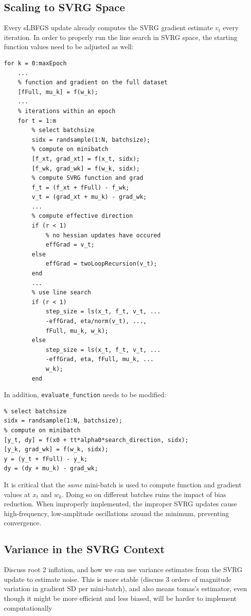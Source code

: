 \documentclass{article}
\begin{document}
\subsection{Scaling to SVRG Space}
Every sLBFGS update already computes the SVRG gradient estimate $v_t$ every iteration. In order to properly run the line search in SVRG space, the starting function values need to be adjusted as well:
\begin{lstlisting}
for k = 0:maxEpoch
	...
	% function and gradient on the full dataset
	[fFull, mu_k] = f(w_k);
	...
	% iterations within an epoch
	for t = 1:m
		% select batchsize 
		sidx = randsample(1:N, batchsize);
		% compute on minibatch
		[f_xt, grad_xt] = f(x_t, sidx);
		[f_wk, grad_wk] = f(w_k, sidx);
		% compute SVRG function and grad
		f_t = (f_xt + fFull) - f_wk;
		v_t = (grad_xt + mu_k) - grad_wk;
		...
		% compute effective direction
		if (r < 1)
			% no hessian updates have occured
			effGrad = v_t;
		else
			effGrad = twoLoopRecursion(v_t);
		end
		...
		% use line search
		if (r < 1)
			step_size = ls(x_t, f_t, v_t, ...
			-effGrad, eta/norm(v_t), ..., 
			fFull, mu_k, w_k);
		else
			step_size = ls(x_t, f_t, v_t, ...
			-effGrad, eta, fFull, mu_k, ...
			w_k);
		end
\end{lstlisting}
In addition, \texttt{evaluate_function} needs to be modified:
\begin{lstlisting}
% select batchsize
sidx = randsample(1:N, batchsize);
% compute on minibatch
[y_t, dy] = f(x0 + tt*alpha0*search_direction, sidx);
[y_k, grad_wk] = f(w_k, sidx);
y = (y_t + fFull) - y_k;
dy = (dy + mu_k) - grad_wk;
\end{lstlisting}
It is critical that the \emph{same} mini-batch is used to compute function and gradient values at $x_t$ and $w_k$. Doing so on different batches ruins the impact of bias reduction. When improperly implemented, the improper SVRG updates cause high-frequency, low-amplitude oscillations around the minimum, preventing convergence.
\subsection{Variance in the SVRG Context}
Discuss root 2 inflation, and how we can use variance estimates from the SVRG update to estimate noise. This is more stable (discuss 3 orders of magnitude variation in gradient SD per mini-batch), and also means tomas's estimator, even though it might be more efficient and less biased, will be harder to implement computationally
\end{document}
